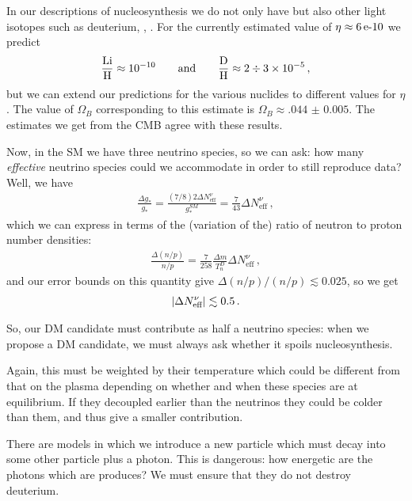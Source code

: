 \documentclass[main.tex]{subfiles}
\begin{document}


In our descriptions of nucleosynthesis we do not only have  but also other light isotopes such as deuterium, , .
For the currently estimated value of \(\eta \approx \ce{6e-10}\) we predict 
%
\begin{align}
\frac{\ce{Li}}{\ce{H}} \approx \num{e-10} 
\qquad \text{and} \qquad
\frac{\ce{D}}{\ce{H}} \approx 2 \divisionsymbol \num{3e-5}
\,,
\end{align}
%
but we can extend our predictions for the various nuclides to different values for \(\eta \).
The value of \(\Omega_{B}\) corresponding to this estimate is \(\Omega_{B} \approx \num{.044(5)}\).
The estimates we get from the CMB agree with these results.

Now, in the SM we have three neutrino species, so we can ask: how many \emph{effective} neutrino species could we accommodate in order to still reproduce data?
Well, we have 
%
\begin{align}
\frac{\Delta g_*}{g_*} = \frac{(7/8) 2 \Delta N_{\text{eff}}^{\nu }}{g_*^{SM}} = \frac{7}{43} \Delta N _{\text{eff}}^{\nu }
\,,
\end{align}
%
which we can express in terms of the (variation of the) ratio of neutron to proton number densities: 
%
\begin{align}
\frac{\Delta (n/p)}{n/p} = \frac{7}{258} \frac{\Delta m}{T_n^{D}} \Delta N _{\text{eff}}^{\nu }
\,,
\end{align}
%
and our error bounds on this quantity give \(\Delta (n/p) / (n/p) \lesssim 0.025\), so we get 
%
\begin{align}
\abs{\Delta N _{\text{eff}}^{\nu }} \lesssim \num{.5}
\,.
\end{align}
%

So, our DM candidate must contribute as half a neutrino species: when we propose a DM candidate, we must always ask whether it spoils nucleosynthesis. 

Again, this must be weighted by their temperature which could be different from that on the plasma depending on whether and when these species are at equilibrium. 
If they decoupled earlier than the neutrinos they could be colder than them, and thus give a smaller contribution. 

There are models in which we introduce a new particle which must decay into some other particle plus a photon. 
This is dangerous: how energetic are the photons which are produces? We must ensure that they do not destroy deuterium. 
\end{document}
